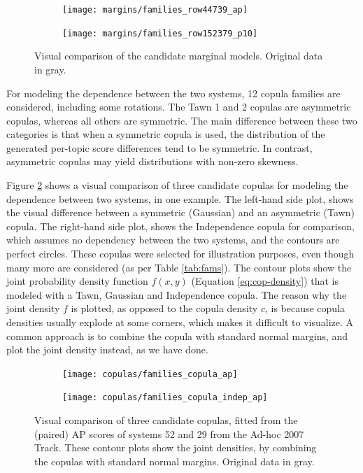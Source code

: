 \begin{figure}[!t]
	\centering
	\begin{subfigure}{.4\textwidth}
		\centering
		\texttt{[image: margins/families\_row44739\_ap]}
	\end{subfigure}%
	\begin{subfigure}{.4\textwidth}
		\centering
		\texttt{[image: margins/families\_row152379\_p10]}
	\end{subfigure}
	\caption{Visual comparison of the candidate marginal models. Original data in gray.}
	\label{fig:fams-margin}
\end{figure}

For modeling the dependence between the two systems, 12 copula families are considered, including some rotations. The Tawn 1 and 2 copulas are asymmetric copulas, whereas all others are symmetric. The main difference between these two categories is that when a symmetric copula is used, the distribution of the generated per-topic score differences tend to be symmetric. In contrast, asymmetric copulas may yield distributions with non-zero skewness. 

Figure \ref{fig:fams-cop} shows a visual comparison of three candidate copulas for modeling the dependence between two systems, in one example. The left-hand side plot, shows the visual difference between a symmetric (Gaussian) and an asymmetric (Tawn) copula. The right-hand side plot, shows the Independence copula for comparison, which assumes no dependency between the two systems, and the contours are perfect circles. These copulas were selected for illustration purposes, even though many more are considered (as per Table \ref{tab:fams}). The contour plots show the joint probability density function $f(x,y)$ (Equation \ref{eq:cop-density}) that is modeled with a Tawn, Gaussian and Independence copula. The reason why the joint density $f$ is plotted, as opposed to the copula density $c$, is because copula densities usually explode at some corners, which makes it difficult to visualize. A common approach is to combine the copula with standard normal margins, and plot the joint density instead, as we have done. 

\begin{figure}[t]
	\centering
	\begin{subfigure}{.4\textwidth}
		\centering
		\texttt{[image: copulas/families\_copula\_ap]}
	\end{subfigure}%
	\begin{subfigure}{.4\textwidth}
		\centering
		\texttt{[image: copulas/families\_copula\_indep\_ap]}
	\end{subfigure}
	\caption{Visual comparison of three candidate copulas, fitted from the (paired) AP scores of systems 52 and 29 from the Ad-hoc 2007 Track. These contour plots show the joint densities, by combining the copulas with standard normal margins. Original data in gray.}
	\label{fig:fams-cop}
\end{figure}


